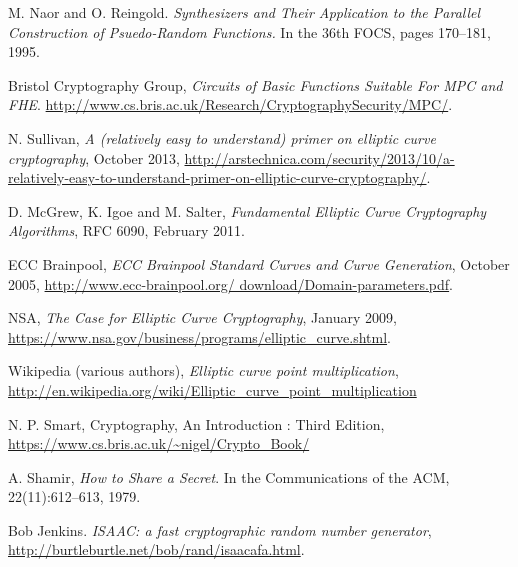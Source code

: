 \documentclass[ %
                    author={Nicholas Tutte},
                supervisor={Prof. Nigel Smart},
                    degree={MEng},
                     title={Secure Two Party Computation},
                  subtitle={A practical comparison of recent protocols},
                      type={Research - GG1K},
                      year={2015} ]{dissertation}
\begin{document}
\begin{thebibliography}{99}
			M. Naor and O. Reingold.
			\emph{Synthesizers and Their Application to the Parallel Construction of Psuedo-Random Functions.}
			In the 36th FOCS,
			pages 170–181,
			1995.

			Bristol Cryptography Group,
			\emph{Circuits of Basic Functions Suitable For MPC and FHE}.  \url{http://www.cs.bris.ac.uk/Research/CryptographySecurity/MPC/}. 

			N. Sullivan,
			\emph{A (relatively easy to understand) primer on elliptic curve cryptography},
			October 2013,
			\url{http://arstechnica.com/security/2013/10/a-relatively-easy-to-understand-primer-on-elliptic-curve-cryptography/}.

			D. McGrew, K. Igoe and M. Salter,
			\emph{Fundamental Elliptic Curve Cryptography Algorithms},
			RFC 6090,
			February 2011.

			ECC Brainpool, \emph{ECC Brainpool Standard Curves and Curve Generation},
			October 2005, \url{http://www.ecc-brainpool.org/
			download/Domain-parameters.pdf}.

			NSA,
			\emph{The Case for Elliptic Curve Cryptography},
			January 2009,
			\url{https://www.nsa.gov/business/programs/elliptic_curve.shtml}.

			Wikipedia (various authors),
			\emph{Elliptic curve point multiplication},
			\url{http://en.wikipedia.org/wiki/Elliptic_curve_point_multiplication}

			N. P. Smart,
			Cryptography, An Introduction : Third Edition,
			\url{https://www.cs.bris.ac.uk/~nigel/Crypto_Book/}
		
			A. Shamir,
			\emph{How to Share a Secret}.
			In the Communications of the ACM,
			22(11):612–613,
			1979.

			Bob Jenkins. \emph{ISAAC: a fast cryptographic random number generator},
			\url{http://burtleburtle.net/bob/rand/isaacafa.html}.

	\end{thebibliography}
\end{document}
